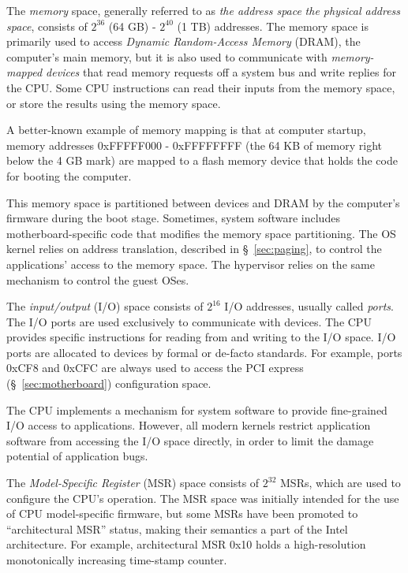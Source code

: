 The \textit{memory} space, generally referred to as \textit{the address space}
\textit{the physical address space}, consists of $2^{36}$ (64 GB) - $2^{40}$
(1 TB) addresses. The memory space is primarily used to access
\textit{Dynamic Random-Access Memory} (DRAM), the computer's main memory, but
it is also used to communicate with \textit{memory-mapped devices} that read
memory requests off a system bus and write replies for the CPU. Some CPU
instructions can read their inputs from the memory space, or store the results
using the memory space.

A better-known example of memory mapping is that at computer startup, memory
addresses 0xFFFFF000 - 0xFFFFFFFF (the 64 KB of memory right below the 4 GB
mark) are mapped to a flash memory device that holds the code for booting the
computer.

This memory space is partitioned between devices and DRAM by the computer's
firmware during the boot stage. Sometimes, system software includes
motherboard-specific code that modifies the memory space partitioning. The OS
kernel relies on address translation, described in \S~\ref{sec:paging}, to
control the applications' access to the memory space. The hypervisor relies on
the same mechanism to control the guest OSes.

The \textit{input/output} (I/O) space consists of $2^{16}$ I/O addresses,
usually called \textit{ports}. The I/O ports are used exclusively to
communicate with devices. The CPU provides specific instructions for reading
from and writing to the I/O space. I/O ports are allocated to devices by formal
or de-facto standards. For example, ports 0xCF8 and 0xCFC are always used to
access the PCI express (\S~\ref{sec:motherboard}) configuration space.

The CPU implements a mechanism for system software to provide fine-grained I/O
access to applications. However, all modern kernels restrict application
software from accessing the I/O space directly, in order to limit the damage
potential of application bugs.


The \textit{Model-Specific Register} (MSR) space consists of $2^{32}$ MSRs,
which are used to configure the CPU's operation. The MSR space was initially
intended for the use of CPU model-specific firmware, but some MSRs have been
promoted to ``architectural MSR'' status, making their semantics a part of the
Intel architecture. For example, architectural MSR 0x10 holds a high-resolution
monotonically increasing time-stamp counter.


